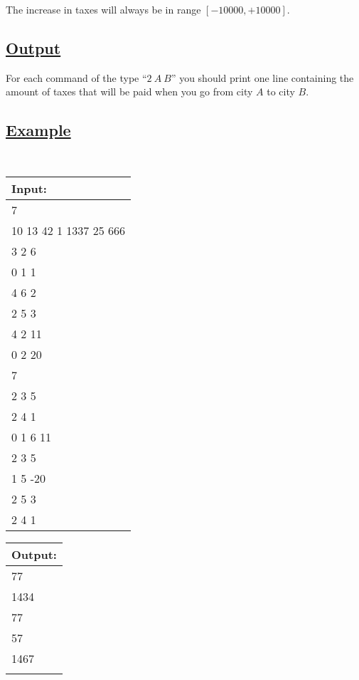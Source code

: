 \documentclass[12pt]{article}
\begin{document}
The increase in taxes will always be in range $[-10000,+10000]$. %


\subsection*{\underline{Output}}
For each command of the type ``$2\ A\ B$'' you should print one line containing the amount of taxes that will be paid when you go from city $A$ to city $B$. 

\subsection*{\underline{Example}}
\begin{center}\tt
 \begin{tabular}{|l|}
\hline
Input: \\
\hline
7\\
10 13 42 1 1337 25 666\\
3 2 6\\
0 1 1\\
4 6 2\\
2 5 3\\
4 2 11\\
0 2 20\\
7\\
2 3 5 \\
2 4 1\\
0 1 6 11\\
2 3 5\\
1 5 -20\\
2 5 3\\
2 4 1\\
\hline
\end{tabular}\qquad\qquad
 \begin{tabular}{|l|}
\hline
Output: \\
\hline
77\\ 
1434\\ 
77\\ 
57\\
1467\\
\hline
\multicolumn{1}{c}{}\\[145pt]
 \end{tabular}
\end{center}
\end{document}
